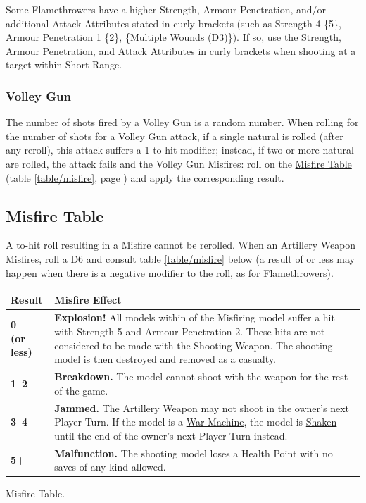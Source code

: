 Some Flamethrowers have a higher Strength, Armour Penetration, and/or additional Attack Attributes stated in curly brackets (such as Strength 4 \{5\}, Armour Penetration 1 \{2\}, \{\hyperref[multiple_wounds]{Multiple Wounds (D3)}\}). If so, use the Strength, Armour Penetration, and Attack Attributes in curly brackets when shooting at a target within Short Range.

\subsubsection{Volley Gun}
\idx[main=y]{\volleygun{}}\label{volley_gun}

The number of shots fired by a Volley Gun is a random number. When rolling for the number of shots for a Volley Gun attack, if a single natural  is rolled (after any reroll), this attack suffers a \minuss{}1 to-hit modifier; instead, if two or more natural  are rolled, the attack fails and the Volley Gun Misfires: roll on the \hyperref[the_misfire_table]{Misfire Table} (table \ref{table/misfire}, page \pageref{table/misfire}) and apply the corresponding result.

\subsection{Misfire Table}
\label{the_misfire_table}

A to-hit roll resulting in a Misfire cannot be rerolled. When an Artillery Weapon Misfires, roll a D6 and consult table \ref{table/misfire} below (a result of  or less may happen when there is a negative modifier to the roll, as for \hyperref[flamethrower]{Flamethrowers}).

\begin{Figure}
	\Tanchor
	\centering
	\setlength{\tabcolsep}{3pt}
	\begin{tabular}{@{}M{1.5cm}m{\columnwidth-1.5cm-6pt}@{}}
		\textbf{Result} & \centering\textbf{Misfire Effect} \tabularnewline
		\midrule
		\textbf{0\newline (or less)} & \textbf{Explosion!} All models within  of the Misfiring model suffer a hit with Strength 5 and Armour Penetration 2. These hits are not considered to be made with the Shooting Weapon. The shooting model is then destroyed and removed as a casualty. \tabularnewline
		\textbf{1--2} & \textbf{Breakdown.} The model cannot shoot with the weapon for the rest of the game. \tabularnewline
		\textbf{3--4} & \textbf{Jammed.} The Artillery Weapon may not shoot in the owner's next Player Turn. If the model is a \hyperref[war_machine]{War Machine}, the model is \hyperref[shaken]{Shaken} until the end of the owner's next Player Turn instead.\tabularnewline
		\textbf{5+} & \textbf{Malfunction.} The shooting model loses a Health Point with no saves of any kind allowed. \tabularnewline
		\bottomrule
	\end{tabular}
	\caption{Misfire Table.}
	\label{table/misfire}
\end{Figure}

